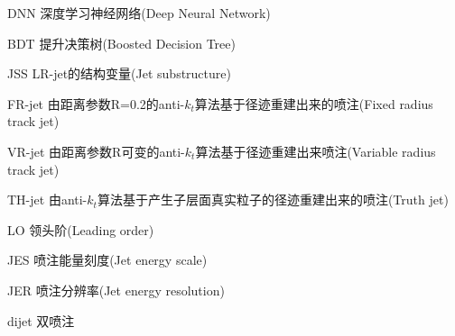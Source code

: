 \begin{denotation}[3cm]
\item[DNN] 深度学习神经网络(Deep Neural Network)
\item[BDT] 提升决策树(Boosted Decision Tree)
\item[JSS] LR-jet的结构变量(Jet substructure)
\item[FR-jet] 由距离参数R=0.2的anti-$k_t$算法基于径迹重建出来的喷注(Fixed radius track jet)
\item[VR-jet] 由距离参数R可变的anti-$k_t$算法基于径迹重建出来喷注(Variable radius track jet)
\item[TH-jet] 由anti-$k_t$算法基于产生子层面真实粒子的径迹重建出来的喷注(Truth jet)
\item[LO] 领头阶(Leading order)
\item[JES] 喷注能量刻度(Jet energy scale)
\item[JER] 喷注分辨率(Jet energy resolution)
\item[dijet] 双喷注
\end{denotation}





